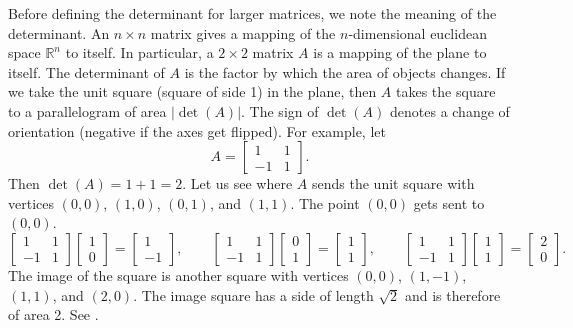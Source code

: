 \documentclass{ximera}
\begin{document}
Before defining the determinant for larger matrices, we note the meaning of the determinant. An $n \times n$ matrix gives a mapping of the $n$-dimensional euclidean space ${\mathbb{R}}^n$ to  itself. In particular, a $2 \times 2$ matrix $A$ is a mapping of the plane to itself.  The determinant of $A$ is the factor by which the area of objects changes. If we take the unit square (square of side 1) in the plane, then $A$ takes the square to a parallelogram of area $\lvert\det(A)\rvert$.  The sign of $\det(A)$ denotes a change of orientation (negative if the axes get flipped).  For example, let
\begin{equation*}
    A =
    \begin{bmatrix}
        1 & 1 \\
        -1 & 1
    \end{bmatrix} .
\end{equation*}
Then $\det(A) = 1+1 = 2$. Let us see where $A$ sends the unit square with vertices $(0,0)$, $(1,0)$, $(0,1)$, and $(1,1)$. The point $(0,0)$ gets sent to $(0,0)$.  
\begin{equation*}
    \begin{bmatrix}
        1 & 1 \\
        -1 & 1
    \end{bmatrix}
    \begin{bmatrix}
        1 \\ 
        0
    \end{bmatrix} =
    \begin{bmatrix}
        1 \\
        -1 
    \end{bmatrix}
    , \qquad
    \begin{bmatrix}
        1 & 1 \\
        -1 & 1
    \end{bmatrix}
    \begin{bmatrix}
        0 \\ 
        1
    \end{bmatrix} =
    \begin{bmatrix}
        1 \\
        1 
    \end{bmatrix}
    , \qquad
    \begin{bmatrix}
        1 & 1 \\
        -1 & 1
    \end{bmatrix}
    \begin{bmatrix}
        1 \\ 
        1
    \end{bmatrix} =
    \begin{bmatrix}
        2 \\
        0 
    \end{bmatrix} .
\end{equation*}
The image of the square is another square with vertices $(0,0)$, $(1,-1)$, $(1,1)$, and $(2,0)$.  The image square has a side of length $\sqrt{2}$ and is therefore of area 2.  See .
\end{document}
